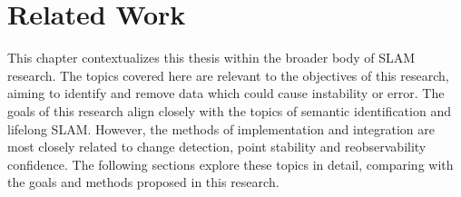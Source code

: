 \section{Related Work}
\label{sec:related_work}

This chapter contextualizes this thesis within the broader body of SLAM research. The topics covered here are relevant to the objectives of this research, aiming to identify and remove data which could cause instability or error. The goals of this research align closely with the topics of semantic identification and lifelong SLAM. However, the methods of implementation and integration are most closely related to change detection, point stability and reobservability confidence. The following sections explore these topics in detail, comparing with the goals and methods proposed in this research.

% 
